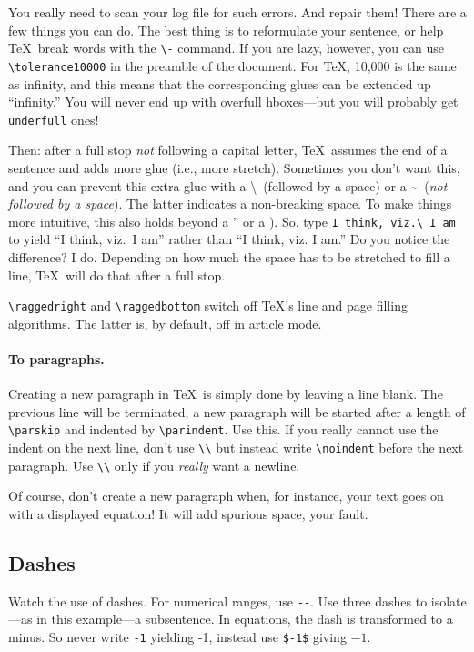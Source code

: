 \documentclass{article}
\begin{document}
You really need to scan your log file for such errors.  And repair them!  There are a few things you can do.  The best thing is to reformulate your sentence, or help \TeX\ break words with the \verb+\-+ command.  If you are lazy, however, you can use \verb+\tolerance10000+ in the preamble of the document.  For \TeX, 10,000 is the same as infinity, and this means that the corresponding glues can be extended up ``infinity.''  You will never end up with overfull hboxes---but you will probably get \verb+underfull+ ones!

Then: after a full stop \textsl{not} following a capital letter, \TeX\ assumes the end of a sentence and adds more glue (i.e., more stretch).  Sometimes you don't want this, and you can prevent this extra glue with a \textbackslash\ (followed by a space) or a \textasciitilde\ (\textsl{not followed by a space}). The latter indicates a non-breaking space. To make things more intuitive, this also holds beyond a '' or a ).  So, type \verb+I think, viz.\ I am+ to yield ``I think, viz.\ I am'' rather than ``I think, viz. I am.'' Do you notice the difference?  I do.  Depending on how much the space has to be stretched to fill a line, \TeX\ will do that after a full stop.


\verb+\raggedright+ and \verb+\raggedbottom+ switch off \TeX's line and page filling algorithms. The latter is, by default, off in article mode.


\paragraph{To paragraphs.}
Creating a new paragraph in \TeX\ is simply done by leaving a line blank. The previous line will be terminated, a new paragraph will be started after a  length of \verb+\parskip+ and indented by \verb+\parindent+.  Use this.  If you really cannot use the indent on the next line, don't use \verb+\\+ but instead write  \verb+\noindent+ before the next paragraph.  Use \verb+\\+ only if you \textsl{really} want a newline.

Of course, don't create a new paragraph when, for instance, your text goes on with a displayed equation!  It will add spurious space, your fault.


\subsection{Dashes}
Watch the use of dashes.  For numerical ranges, use \verb+--+.  Use three  dashes to isolate---as in this example---a subsentence.  In equations, the dash is transformed to a minus.  So never write \verb+-1+ yielding -1, instead use \verb+$-1$+ giving $-1$.
\end{document}
